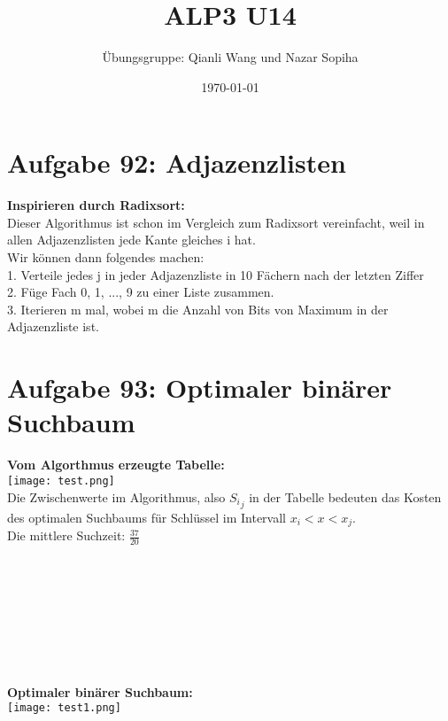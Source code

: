 \documentclass{article}
\title{ALP3 U14}
\author{Übungsgruppe: Qianli Wang und Nazar Sopiha}
\date{\today}
\begin{document}
\maketitle

\section{Aufgabe 92: Adjazenzlisten}
\textbf{Inspirieren durch Radixsort:}\\
Dieser Algorithmus ist schon im Vergleich zum Radixsort vereinfacht, weil in allen Adjazenzlisten jede Kante gleiches i hat.\\
Wir können dann folgendes machen:\\
1. Verteile jedes j in jeder Adjazenzliste in 10 Fächern nach der letzten Ziffer  \\
2. Füge Fach 0, 1, ..., 9 zu einer Liste zusammen.\\
3. Iterieren m mal, wobei m die Anzahl von Bits von Maximum in der Adjazenzliste ist.

\section{Aufgabe 93: Optimaler binärer Suchbaum}
\textbf{Vom Algorthmus erzeugte Tabelle:}\\
\texttt{[image: test.png]}\\
Die Zwischenwerte im Algorithmus, also ${S_i}_j$ in der Tabelle bedeuten das Kosten des optimalen Suchbaums für Schlüssel im Intervall $x_i < x < x_j$. \\
Die mittlere Suchzeit: $\frac{37}{20}$\\
\\
\\
\\
\\
\\
\\
\\
\\
\textbf{Optimaler binärer Suchbaum:}\\
\texttt{[image: test1.png]}\\
\end{document}
